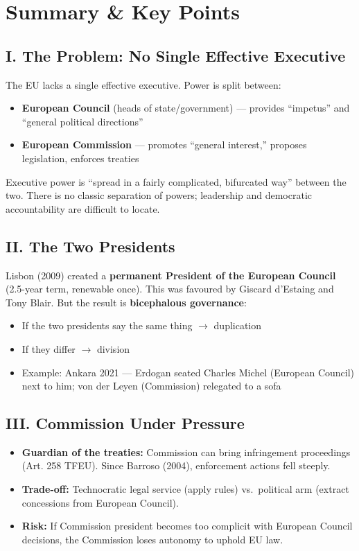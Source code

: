 \documentclass[11pt,a4paper]{article}
\begin{document}
\section*{Summary \& Key Points}

\subsection*{I. The Problem: No Single Effective Executive}

The EU lacks a single effective executive. Power is split between:
\begin{itemize}
\item \textbf{European Council} (heads of state/government) --- provides ``impetus'' and ``general political directions''
\item \textbf{European Commission} --- promotes ``general interest,'' proposes legislation, enforces treaties
\end{itemize}

Executive power is ``spread in a fairly complicated, bifurcated way'' between the two. There is no classic separation of powers; leadership and democratic accountability are difficult to locate.

\subsection*{II. The Two Presidents}

Lisbon (2009) created a \textbf{permanent President of the European Council} (2.5-year term, renewable once). This was favoured by Giscard d'Estaing and Tony Blair. But the result is \textbf{bicephalous governance}:
\begin{itemize}
\item If the two presidents say the same thing $\to$ duplication
\item If they differ $\to$ division
\item Example: Ankara 2021 --- Erdogan seated Charles Michel (European Council) next to him; von der Leyen (Commission) relegated to a sofa
\end{itemize}

\subsection*{III. Commission Under Pressure}

\begin{itemize}
\item \textbf{Guardian of the treaties:} Commission can bring infringement proceedings (Art. 258 TFEU). Since Barroso (2004), enforcement actions fell steeply.
\item \textbf{Trade-off:} Technocratic legal service (apply rules) vs.\ political arm (extract concessions from European Council).
\item \textbf{Risk:} If Commission president becomes too complicit with European Council decisions, the Commission loses autonomy to uphold EU law.
\end{itemize}
\end{document}
